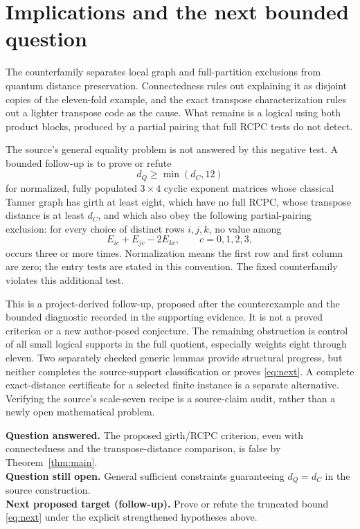 \documentclass[11pt]{article}
\theoremstyle{definition}\newtheorem{definition}[theorem]{Definition}
\begin{document}
\section{Implications and the next bounded question}\label{sec:limits}
The counterfamily separates local graph and full-partition exclusions
from quantum distance preservation. Connectedness rules out explaining
it as disjoint copies of the eleven-fold example, and the exact
transpose characterization rules out a lighter transpose code as the
cause. What remains is a logical using both product blocks, produced
by a partial pairing that full RCPC tests do not detect.

The source's general equality problem is not answered by this negative
test. A bounded follow-up is to prove or refute
\begin{equation}\label{eq:next}
 d_Q\geq\min(d_C,12)
\end{equation}
for normalized, fully populated $3\times4$ cyclic exponent matrices
whose classical Tanner graph has girth at least eight, which have no
full RCPC, whose transpose distance is at least $d_C$, and which also
obey the following partial-pairing exclusion: for every choice of
distinct rows $i,j,k$, no value among
\[
 E_{ic}+E_{jc}-2E_{kc},\qquad c=0,1,2,3,
\]
occurs three or more times. Normalization means the first row and
first column are zero; the entry tests are stated in this convention.
The fixed counterfamily violates this additional test.

This is a project-derived follow-up, proposed after the counterexample
and the bounded diagnostic recorded in the supporting evidence. It
is not a proved criterion or a new author-posed conjecture. The
remaining obstruction is control of all small logical supports in
the full quotient, especially weights eight through eleven. Two
separately checked generic lemmas provide structural progress, but
neither completes the source-support classification or proves
\eqref{eq:next}. A complete exact-distance certificate for a selected
finite instance is a separate alternative. Verifying the source's
scale-seven recipe is a source-claim audit, rather than a newly open
mathematical problem.

\noindent\textbf{Question answered.} The proposed girth/RCPC criterion,
even with connectedness and the transpose-distance comparison, is
false by Theorem~\ref{thm:main}.\\
\textbf{Question still open.} General sufficient constraints guaranteeing
$d_Q=d_C$ in the source construction.\\
\textbf{Next proposed target (follow-up).} Prove or refute the truncated
bound \eqref{eq:next} under the explicit strengthened hypotheses above.
\end{document}
